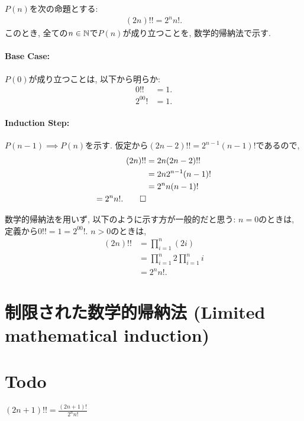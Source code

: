 \begin{proof*}
  $P(n)$を次の命題とする:
  \begin{align*}
    (2n)!!=2^nn!.
  \end{align*}
  このとき,
  全ての$n\in\mathbb{N}$で$P(n)$が成り立つことを,
  数学的帰納法で示す.

  \paragraph{Base Case:}
  $P(0)$が成り立つことは, 以下から明らか:
  \begin{align*}
    0!!&=1.\\
    2^00!&=1.
  \end{align*}

  \paragraph{Induction Step:}
  $P(n-1)\implies P(n)$を示す.
  仮定から$(2n-2)!!=2^{n-1}(n-1)!$であるので,
  \begin{align*}
    (2n)!!
    &=2n(2n-2)!!\\
    &=2n2^{n-1}(n-1)!\\
    &=2^{n}n(n-1)!\\
    =2^nn!
    .\qedhere
  \end{align*}
\end{proof*}

\begin{rem}
  数学的帰納法を用いず, 以下のように示す方が一般的だと思う:
  $n=0$のときは, 定義から$0!!=1=2^00!$.
  $n>0$のときは,
  \begin{align*}
    (2n)!!
    &=\prod_{i=1}^{n}(2i)\\
    &=\prod_{i=1}^{n}2\prod_{i=1}^{n}i\\
    &=2^nn!.
  \end{align*}
\end{rem}

\section{制限された数学的帰納法 (Limited mathematical induction)}


\section{Todo}




\begin{prop}
  $(2n+1)!!=\frac{(2n+1)!}{2^nn!}$
\end{prop}

